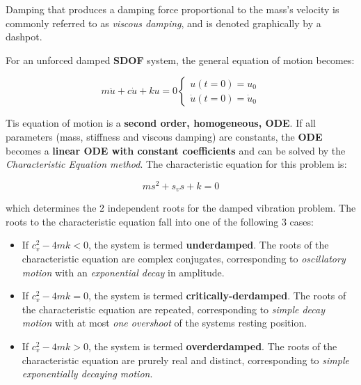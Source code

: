 \documentclass[10pt,b5paper,titlepage]{book}
\begin{document}
Damping that produces a damping force proportional to the mass's velocity is
commonly referred to as \textit{viscous damping}, and is denoted graphically
by a dashpot.

For an unforced damped \textbf{SDOF} system, the general equation of motion
becomes:

\begin{equation}
    m \ddot{u} + c \dot{u} + k u = 0
        \left\{ \begin{matrix}
                u(t=0) = u_0\\
                \dot{u}(t=0) = \dot{u}_0
          \end{matrix} \right.
\end{equation}

Tis equation of motion is a \textbf{second order, homogeneous, ODE}. If all
parameters (mass, stiffness and viscous damping) are constants, the \textbf{ODE}
becomes a \textbf{linear ODE with constant coefficients} and can be solved by
the \textit{Characteristic Equation method}. The characteristic equation for this
problem is:

\begin{equation}
    m s^2 + s_v s + k = 0
\end{equation}

which determines the 2 independent roots for the damped vibration problem.
The roots to the characteristic equation fall into one of the following
3 cases:

\begin{itemize}
    \item If $ c_v^2 - 4 m k < 0 $, the system is termed \textbf{underdamped}.
        The roots of the characteristic equation are complex conjugates,
        corresponding to \textit{oscillatory motion} with an
        \textit{exponential decay} in amplitude.

    \item If $ c_v^2 - 4 m k = 0 $, the system is termed \textbf{critically-derdamped}.
        The roots of the characteristic equation are repeated,
        corresponding to \textit{simple decay motion} with at most
        \textit{one overshoot} of the systems resting position.

    \item If $ c_v^2 - 4 m k > 0 $, the system is termed \textbf{overderdamped}.
        The roots of the characteristic equation are prurely real and distinct,
        corresponding to \textit{simple exponentially decaying motion}.

\end{itemize}
\end{document}
